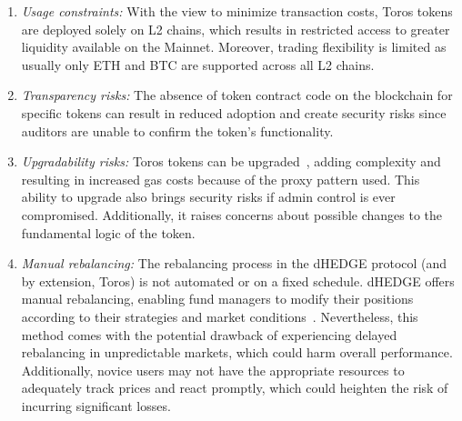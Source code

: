 \begin{enumerate}[label={\ref{subsec:toros}.\arabic*},leftmargin=*]
	\item \textit{Usage constraints:} With the view to minimize transaction costs, Toros tokens are deployed solely on L2 chains, which results in restricted access to greater liquidity available on the Mainnet. Moreover, trading flexibility is limited as usually only ETH and BTC are supported across all L2 chains.
	
	\item \textit{Transparency risks:} The absence of token contract code on the blockchain for specific tokens can result in reduced adoption and create security risks since auditors are unable to confirm the token's functionality.
	
	\item \textit{Upgradability risks:} Toros tokens can be upgraded~\cite{Toros_Doc}, adding complexity and resulting in increased gas costs because of the proxy pattern used. This ability to upgrade also brings security risks if admin control is ever compromised. Additionally, it raises concerns about possible changes to the fundamental logic of the token.
	
	\item \textit{Manual rebalancing:} The rebalancing process in the dHEDGE protocol (and by extension, Toros) is not automated or on a fixed schedule. dHEDGE offers manual rebalancing, enabling fund managers to modify their positions according to their strategies and market conditions~\cite{dHEDGE_Design}. Nevertheless, this method comes with the potential drawback of experiencing delayed rebalancing in unpredictable markets, which could harm overall performance. Additionally, novice users may not have the appropriate resources to adequately track prices and react promptly, which could heighten the risk of incurring significant losses.
\end{enumerate}

